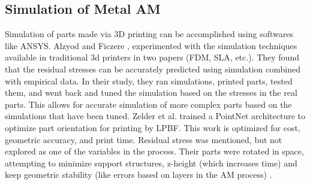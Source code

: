 \subsection{Simulation of Metal AM}
Simulation of parts made via 3D printing can be accomplished using softwares like ANSYS.  Alzyod and Ficzere \cite{alzyod2023material}, \cite{alzyod2023rapid} experimented with the simulation techniques available in traditional 3d printers in two papers (FDM, SLA, etc.).  They found that the residual stresses can be accurately predicted using simulation combined with empirical data.  In their study, they ran simulations, printed parts, tested them, and went back and tuned the simulation based on the stresses in the real parts.  This allows for accurate simulation of more complex parts based on the simulations that have been tuned.  Zelder et al. \cite{zelder2025learning} trained a PointNet architecture to optimize part orientation for printing by LPBF.  This work is optimized for cost, geometric accuracy, and print time.  Residual stress was mentioned, but not explored as one of the variables in the process.  Their parts were rotated in space, attempting to minimize support structures, z-height (which increases time) and keep geometric stability (like errors based on layers  in the AM process) \cite{zelder2025learning}.  
